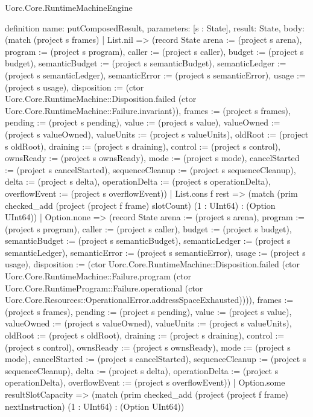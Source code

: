 \begin{lexlean}{Uorc.Core.RuntimeMachineEngine}
\begin{semanticmodule}
definition{
  name: putComposedResult,
  parameters: [s : State],
  result: State,
  body: (match (project s frames)
    | List.nil => (record State {arena := (project s arena), program := (project s program), caller := (project s caller), budget := (project s budget), semanticBudget := (project s semanticBudget), semanticLedger := (project s semanticLedger), semanticError := (project s semanticError), usage := (project s usage), disposition := (ctor Uorc.Core.RuntimeMachine::Disposition.failed (ctor Uorc.Core.RuntimeMachine::Failure.invariant)), frames := (project s frames), pending := (project s pending), value := (project s value), valueOwned := (project s valueOwned), valueUnits := (project s valueUnits), oldRoot := (project s oldRoot), draining := (project s draining), control := (project s control), ownsReady := (project s ownsReady), mode := (project s mode), cancelStarted := (project s cancelStarted), sequenceCleanup := (project s sequenceCleanup), delta := (project s delta), operationDelta := (project s operationDelta), overflowEvent := (project s overflowEvent)})
    | List.cons f rest => (match (prim checked_add (project (project f frame) slotCount) (1 : UInt64) : (Option UInt64))
      | Option.none => (record State {arena := (project s arena), program := (project s program), caller := (project s caller), budget := (project s budget), semanticBudget := (project s semanticBudget), semanticLedger := (project s semanticLedger), semanticError := (project s semanticError), usage := (project s usage), disposition := (ctor Uorc.Core.RuntimeMachine::Disposition.failed (ctor Uorc.Core.RuntimeMachine::Failure.program (ctor Uorc.Core.RuntimeProgram::Failure.operational (ctor Uorc.Core.Resources::OperationalError.addressSpaceExhausted)))), frames := (project s frames), pending := (project s pending), value := (project s value), valueOwned := (project s valueOwned), valueUnits := (project s valueUnits), oldRoot := (project s oldRoot), draining := (project s draining), control := (project s control), ownsReady := (project s ownsReady), mode := (project s mode), cancelStarted := (project s cancelStarted), sequenceCleanup := (project s sequenceCleanup), delta := (project s delta), operationDelta := (project s operationDelta), overflowEvent := (project s overflowEvent)})
      | Option.some resultSlotCapacity => (match (prim checked_add (project (project f frame) nextInstruction) (1 : UInt64) : (Option UInt64))
}
\end{semanticmodule}
\end{lexlean}
